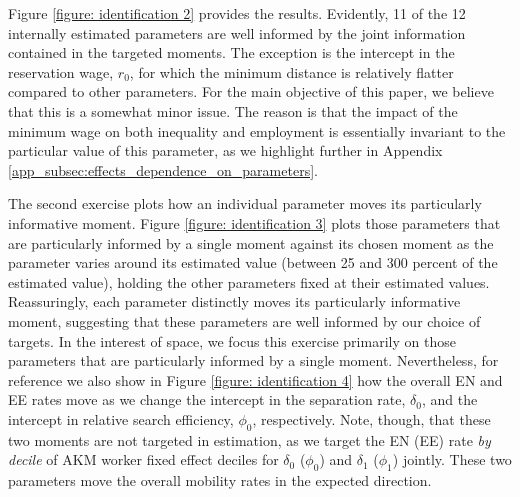 Figure \ref{figure: identification 2} provides the results. Evidently, 11 of the 12 internally estimated parameters are well informed by the joint information contained in the targeted moments. The exception is the intercept in the reservation wage, $r_0$, for which the minimum distance is relatively flatter compared to other parameters. For the main objective of this paper, we believe that this is a somewhat minor issue. The reason is that the impact of the minimum wage on both inequality and employment is essentially invariant to the particular value of this parameter, as we highlight further in Appendix \ref{app_subsec:effects_dependence_on_parameters}.

The second exercise plots how an individual parameter moves its particularly informative moment. Figure \ref{figure: identification 3} plots those parameters that are particularly informed by a single moment against its chosen moment as the parameter varies around its estimated value (between 25 and 300 percent of the estimated value), holding the other parameters fixed at their estimated values. Reassuringly, each parameter distinctly moves its particularly informative moment, suggesting that these parameters are well informed by our choice of targets. In the interest of space, we focus this exercise primarily on those parameters that are particularly informed by a single moment. Nevertheless, for reference we also show in Figure \ref{figure: identification 4} how the overall EN and EE rates move as we change the intercept in the separation rate, $\delta_0$, and the intercept in relative search efficiency, $\phi_0$, respectively. Note, though, that these two moments are not targeted in estimation, as we target the EN (EE) rate \textit{by decile} of AKM worker fixed effect deciles for $\delta_0$ ($\phi_0$) and $\delta_1$ ($\phi_1$) jointly. These two parameters move the overall mobility rates in the expected direction.

